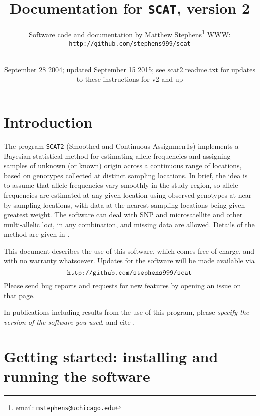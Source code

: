 \documentclass[11pt,titlepage,times,letterpaper]{article}
\def\SCAT{{\tt SCAT2} }
\begin{document}
\title{Documentation for {\tt SCAT}, version 2}

\author{
Software code and documentation by Matthew Stephens\footnote{email: {\tt mstephens@uchicago.edu}}
WWW: {\tt http://github.com/stephens999/scat}\\
\\
}

\date{September 28 2004; updated September 15 2015; see scat2.readme.txt for updates to these instructions for v2 and up}

\maketitle

\tableofcontents
\vfil\eject
\section{Introduction}

The program \SCAT (Smoothed and Continuous AssignmenTs)
implements a Bayesian statistical method for estimating allele
frequencies and assigning samples of unknown (or known) origin across
a continuous range of locations, based on genotypes collected at
distinct sampling locations.  In brief, the idea is to assume that allele
frequencies vary smoothly in the study region, so allele frequencies
are estimated at any given location using observed genotypes at
near-by sampling locations, with data at the nearest sampling
locations being given greatest weight.  The software can deal with SNP
and microsatellite and other multi-allelic loci, in any combination,
and missing data are allowed. Details of the method are given in
\cite{wasser.etal.04}.

This document describes the use of this software, which comes free of
charge, and with no warranty whatsoever.  Updates for the software
will be made available via
$$\text{{\tt http://github.com/stephens999/scat}}$$
Please send bug reports and requests for new features by opening an issue on that page.

In publications including results from the use of this program, please
{\it specify the version of the software you used}, and cite
\cite{wasser.etal.04}.




\section{Getting started: installing and running the software}
\label{started}
\end{document}
